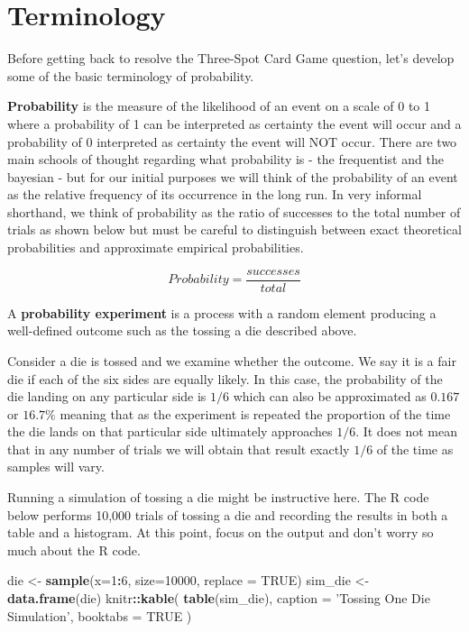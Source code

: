 \documentclass[]{book}
\newenvironment{Shaded}{\begin{snugshade}}{\end{snugshade}}
\newcommand{\KeywordTok}[1]{\textcolor[rgb]{0.13,0.29,0.53}{\textbf{#1}}}
\newcommand{\DataTypeTok}[1]{\textcolor[rgb]{0.13,0.29,0.53}{#1}}
\newcommand{\DecValTok}[1]{\textcolor[rgb]{0.00,0.00,0.81}{#1}}
\newcommand{\StringTok}[1]{\textcolor[rgb]{0.31,0.60,0.02}{#1}}
\newcommand{\OtherTok}[1]{\textcolor[rgb]{0.56,0.35,0.01}{#1}}
\newcommand{\OperatorTok}[1]{\textcolor[rgb]{0.81,0.36,0.00}{\textbf{#1}}}
\newcommand{\NormalTok}[1]{#1}
\theoremstyle{definition}
\theoremstyle{definition}
\theoremstyle{definition}
\theoremstyle{remark}
\begin{document}
\section{Terminology}\label{terminology}

Before getting back to resolve the Three-Spot Card Game question, let's
develop some of the basic terminology of probability.

\textbf{Probability} is the measure of the likelihood of an event on a
scale of 0 to 1 where a probability of 1 can be interpreted as certainty
the event will occur and a probability of 0 interpreted as certainty the
event will NOT occur. There are two main schools of thought regarding
what probability is - the frequentist and the bayesian - but for our
initial purposes we will think of the probability of an event as the
relative frequency of its occurrence in the long run. In very informal
shorthand, we think of probability as the ratio of successes to the
total number of trials as shown below but must be careful to distinguish
between exact theoretical probabilities and approximate empirical
probabilities.

\[Probability = \frac{successes}{total}\]

A \textbf{probability experiment} is a process with a random element
producing a well-defined outcome such as the tossing a die described
above.

Consider a die is tossed and we examine whether the outcome. We say it
is a fair die if each of the six sides are equally likely. In this case,
the probability of the die landing on any particular side is \(1/6\)
which can also be approximated as \(0.167\) or \(16.7\%\) meaning that
as the experiment is repeated the proportion of the time the die lands
on that particular side ultimately approaches \(1/6\). It does not mean
that in any number of trials we will obtain that result exactly \(1/6\)
of the time as samples will vary.

Running a simulation of tossing a die might be instructive here. The R
code below performs 10,000 trials of tossing a die and recording the
results in both a table and a histogram. At this point, focus on the
output and don't worry so much about the R code.

\begin{Shaded}
\begin{Highlighting}[]
\NormalTok{die <-}\StringTok{ }\KeywordTok{sample}\NormalTok{(}\DataTypeTok{x=}\DecValTok{1}\OperatorTok{:}\DecValTok{6}\NormalTok{, }\DataTypeTok{size=}\DecValTok{10000}\NormalTok{, }\DataTypeTok{replace =} \OtherTok{TRUE}\NormalTok{)}
\NormalTok{sim_die <-}\StringTok{ }\KeywordTok{data.frame}\NormalTok{(die)}
\NormalTok{knitr}\OperatorTok{::}\KeywordTok{kable}\NormalTok{(}
  \KeywordTok{table}\NormalTok{(sim_die), }\DataTypeTok{caption =} \StringTok{'Tossing One Die Simulation'}\NormalTok{,}
  \DataTypeTok{booktabs =} \OtherTok{TRUE}
\NormalTok{)}
\end{Highlighting}
\end{Shaded}
\end{document}
